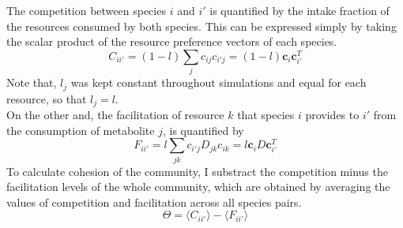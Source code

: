 \documentclass[12pt]{article}
\begin{document}
	The competition between species $ i $ and $ i' $ is quantified by the intake fraction of the resources consumed by both species. This can be expressed simply by taking the scalar product of the resource preference vectors of each species. 
	\begin{equation}
		C_{ii'} = (1- l)\sum_{j}c_{ij}c_{i'j} =  (1-l) \boldsymbol{c}_i\boldsymbol{c}^T_{i'}
	\end{equation}
	Note that, $ l_j $ was kept constant throughout simulations and equal for each resource, so that $ l_j = l $.\\
	On the other and, the facilitation of resource $ k $ that species $ i $ provides to $ i' $ from the consumption of metabolite $ j $, is quantified by 
	\begin{equation}
	    F_{ii'} = l\sum_{jk}c_{i'j}D_{jk}c_{ik} = l\boldsymbol{c}_iD\boldsymbol{c}_{i'}^T
	\end{equation}
	To calculate cohesion of the community, I substract the competition minus the facilitation levels of the whole community, which are obtained by averaging the values of competition and facilitation across all species pairs.
	\begin{equation}
	    \Theta = \langle C_{ii'} \rangle - \langle F_{ii'} \rangle
	\end{equation}
\end{document}
